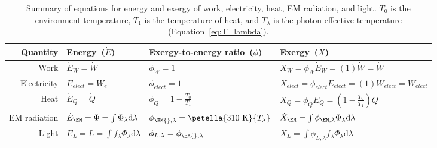 

\begin{table}
\centering %
\caption{Summary of equations for energy and exergy of work, electricity, heat, EM radiation, and light.
         $T_0$ is the environment temperature, $T_1$ is the temperature of heat, 
         and $T_\lambda$ is the photon effective temperature
         (Equation~\ref{eq:T_lambda}).}
\begin{tabular}{r l l l}
  \toprule
  Quantity & Energy~($\dot{E}$) & Exergy-to-energy ratio~($\phi$) & Exergy~($\dot{X}$) \\
  \midrule
  Work        
      & $\dot{E}_W = \dot{W}$
      & $\phi_W = 1$
      & $\dot{X}_W = \phi_W \dot{E}_W = (1) \dot{W} = \dot{W}$ \\
  Electricity 
      & $\dot{E}_{elect} = \dot{W}_e$
      & $\phi_{elect} = 1$
      & $\dot{X}_{elect} = \phi_{elect} \dot{E}_{elect} = (1) \dot{W}_{elect} = \dot{W}_{elect}$ \\
  Heat 
      & $\dot{E}_Q = \dot{Q}$   
      & $\phi_Q = 1 - \frac{T_0}{T_1}$  
      & $ \dot{X}_Q = \phi_Q \dot{E}_Q = \left( 1 - \frac{T_0}{T_1} \right) \dot{Q}  $ \\
  EM radiation
      & $\dot{E}_{\EM} = \Phi = \int \Phi_\lambda \mathrm{d}\lambda$ 
      & $\phi_{\EM{},\lambda} = \petella{310 \text{ K}}{T_\lambda}$ 
      & $\dot{X}_{\EM} = \int \phi_{\EM,\lambda} \Phi_\lambda \mathrm{d}\lambda$ \\
  Light
      & $\dot{E}_L = \dot{L} = \int f_\lambda \Phi_\lambda \mathrm{d}\lambda$
      & $\phi_{L,\lambda} = \phi_{\EM{},\lambda}$ 
      & $\dot{X}_L = \int \phi_{L,\lambda} f_\lambda \Phi_\lambda \mathrm{d}\lambda$ \\
  \bottomrule
\end{tabular}
\label{tab:EX_summary}
\end{table}


